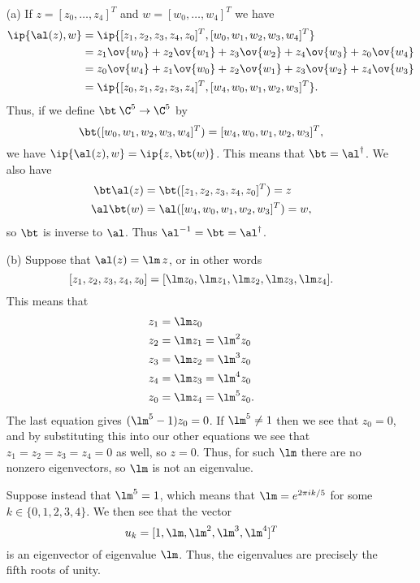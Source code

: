 \begin{solution}
 \begin{itemize}
  \item[(a)] If $z=[z_0,\dotsc,z_4]^T$ and $w=[w_0,\dotsc,w_4]^T$ we
   have 
   \begin{align*}
    \ip{\al(z),w} &= 
     \ip{[z_1,z_2,z_3,z_4,z_0]^T,[w_0,w_1,w_2,w_3,w_4]^T} \\
    &= z_1\ov{w_0} + z_2\ov{w_1} + z_3\ov{w_2} + z_4\ov{w_3} + z_0\ov{w_4} \\
    &= z_0\ov{w_4} + z_1\ov{w_0} + z_2\ov{w_1} + z_3\ov{w_2} + z_4\ov{w_3} \\
    &= \ip{[z_0,z_1,z_2,z_3,z_4]^T,[w_4,w_0,w_1,w_2,w_3]^T}. \\
   \end{align*}
   Thus, if we define $\bt\:\C^5\to\C^5$ by 
   \[ \bt([w_0,w_1,w_2,w_3,w_4]^T) = [w_4,w_0,w_1,w_2,w_3]^T, \]
   we have $\ip{\al(z),w}=\ip{z,\bt(w)}$.  This means that
   $\bt=\al^\dag$.  We also have
   \begin{align*}
    \bt\al(z) &= \bt([z_1,z_2,z_3,z_4,z_0]^T) = z \\
    \al\bt(w) &= \al([w_4,w_0,w_1,w_2,w_3]^T) = w,
   \end{align*}
   so $\bt$ is inverse to $\al$.  Thus $\al^{-1}=\bt=\al^\dag$.
  \item[(b)] Suppose that $\al(z)=\lm\,z$, or in other words 
   \[ [z_1,z_2,z_3,z_4,z_0] =
       [\lm z_0,\lm z_1,\lm z_2,\lm z_3,\lm z_4].
   \]
   This means that
   \begin{align*}
    z_1 &= \lm z_0 \\
    z_2 &= \lm z_1 = \lm^2 z_0 \\
    z_3 &= \lm z_2 = \lm^3 z_0 \\
    z_4 &= \lm z_3 = \lm^4 z_0 \\
    z_0 &= \lm z_4 = \lm^5 z_0.
   \end{align*}
   The last equation gives $(\lm^5-1)z_0=0$.  If $\lm^5\neq 1$ then we
   see that $z_0=0$, and by substituting this into our other
   equations we see that $z_1=z_2=z_3=z_4=0$ as well, so $z=0$.  Thus,
   for such $\lm$ there are no nonzero eigenvectors, so $\lm$ is not
   an eigenvalue.  

   Suppose instead that $\lm^5=1$, which means that $\lm=e^{2\pi
    ik/5}$ for some $k\in\{0,1,2,3,4\}$.  We then see that the vector 
   \[ u_k = [1,\lm,\lm^2,\lm^3,\lm^4]^T \]
   is an eigenvector of eigenvalue $\lm$.  Thus, the eigenvalues are
   precisely the fifth roots of unity.
 \end{itemize}
\end{solution}

